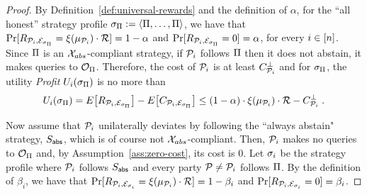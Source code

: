 \begin{proof}
    By Definition~\ref{def:universal-rewards} and the definition of $\alpha$,
    for the ``all honest'' strategy profile $\sigma_{\Pi} := \langle
    \Pi, \ldots, \Pi \rangle$, we have that
    $\Pr[R_{\mathcal{P}_i, \mathcal{E}_{\sigma_{\Pi}}} = \xi(\mu_{\mathcal{P}_i}) \cdot \mathcal{R}] = 1 - \alpha$
    and $\Pr[R_{\mathcal{P}_i, \mathcal{E}_{\sigma_{\Pi}}} = 0] = \alpha$,
    for every $i \in [n]$.  Since $\Pi$ is an
    $\mathcal{X}_{abs}$-compliant strategy, if $\mathcal{P}_i$ follows
    $\Pi$ then it does not abstain, \ie it makes queries to
    $\mathcal{O}_\Pi$. Therefore, the cost of $\mathcal{P}_i$ is at least
    $C^\bot_{\mathcal{P}_i}$ and for $\sigma_{\Pi}$, the utility
    \emph{Profit} $U_i(\sigma_{\Pi})$ is no more than
    \[U_i(\sigma_{\Pi}) = E\big[R_{\mathcal{P}_i, \mathcal{E}_{\sigma_{\Pi}}}\big] - E\big[C_{\mathcal{P}_i, \mathcal{E}_{\sigma_{\Pi}}}\big] \leq (1 - \alpha) \cdot \xi(\mu_{\mathcal{P}_i}) \cdot \mathcal{R} - C^\bot_{\mathcal{P}_i}\;.\]

    Now assume that $\mathcal{P}_i$ unilaterally deviates by following the ``always
    abstain" strategy, $S_\mathsf{abs}$, which is of course not
    $\mathcal{X}_{abs}$-compliant. Then, $\mathcal{P}_i$ makes no queries
    to $\mathcal{O}_\Pi$ and, by Assumption~\ref{ass:zero-cost}, its cost is
    $0$. Let $\sigma_i$ be the strategy profile where $\mathcal{P}_i$ follows
    $S_\mathsf{abs}$ and every party $\mathcal{P} \neq \mathcal{P}_i$ follows
    $\Pi$. By the definition of $\beta_i$, we have that
    $\Pr[R_{\mathcal{P}_i, \mathcal{E}_{\sigma_i}} = \xi(\mu_{\mathcal{P}_i}) \cdot \mathcal{R}] = 1 - \beta_i$ and $\Pr[R_{\mathcal{P}_i, \mathcal{E}_{\sigma_i}} = 0] = \beta_i$.


\end{proof}
